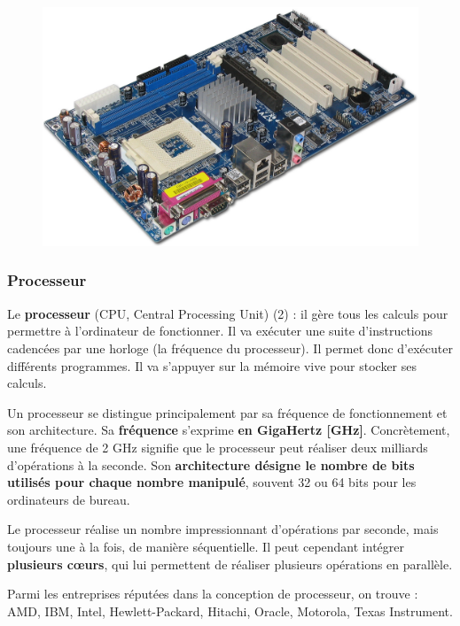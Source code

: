 \documentclass[11pt, a4paper]{book}
\begin{document}
\begin{figure}[h]
	\centering
	\includegraphics[scale=.4]{images/cartemere}

\end{figure}

\subsubsection{Processeur}
Le {\bf processeur} (CPU, Central Processing Unit) (2) : il gère tous les calculs pour permettre à l'ordinateur de fonctionner. Il va exécuter une suite d'instructions cadencées par une horloge (la fréquence du processeur). Il permet donc d'exécuter différents programmes. Il va s'appuyer sur la mémoire vive pour stocker ses calculs.

Un processeur se distingue principalement par sa fréquence de fonctionnement et son architecture. Sa\textbf{ fréquence} s'exprime \textbf{en GigaHertz [GHz]}. Concrètement, une fréquence de 2 GHz signifie que le processeur peut réaliser deux milliards d'opérations à la seconde.
Son \textbf{architecture désigne le nombre de bits utilisés pour chaque nombre manipulé}, souvent 32 ou 64 bits pour les ordinateurs de bureau.

Le processeur réalise un nombre impressionnant d'opérations par seconde, mais toujours une à la fois, de manière séquentielle. Il peut cependant intégrer \textbf{plusieurs cœurs}, qui lui permettent de réaliser plusieurs opérations en parallèle.

Parmi les entreprises réputées dans la conception de processeur, on trouve : AMD, IBM, Intel, Hewlett-Packard, Hitachi, Oracle, Motorola, Texas Instrument.
\end{document}
